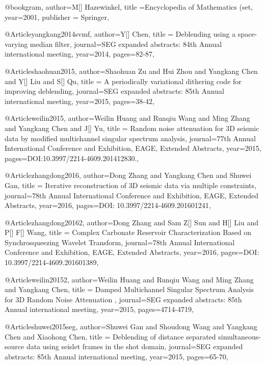 {@book{gram,
  author={M[] Hazewinkel},
  title ={Encyclopedia of Mathematics (set},
  year=2001,
  publisher = {Springer},
}



@Article{yangkang2014svmf,
  author={Y[] Chen},
  title = {Deblending using a space-varying median filter},
  journal={SEG expanded abstracts: 84th Annual international meeting},
  year=2014,
  pages={82-87},
}

@Article{shaohuan2015,
  author={Shaohuan Zu and Hui Zhou and Yangkang Chen and Y[] Liu and S[] Qu},
  title = {A periodically variational dithering code for improving deblending},
  journal={SEG expanded abstracts: 85th Annual international meeting},
  year=2015,
  pages={38-42},
}

@Article{weilin2015,
  author={Weilin Huang and Runqiu Wang and Ming Zhang and Yangkang Chen and J[] Yu},
  title = {Random noise attenuation for 3{D} seismic data by modified multichannel singular spectrum analysis},
  journal={77th Annual International Conference and Exhibition, EAGE, Extended Abstracts},
  year=2015,
  pages={DOI:10.3997/2214-4609.201412830.},
}

@Article{zhangdong2016,
  author={Dong Zhang and Yangkang Chen and Shuwei Gan},
  title = {Iterative reconstruction of 3D seismic data via multiple constraints},
  journal={78th Annual International Conference and Exhibition, EAGE, Extended Abstracts},
  year=2016,
  pages={DOI: 10.3997/2214-4609.201601241},
}

@Article{zhangdong20162,
  author={Dong Zhang and Sam Z[] Sun and H[] Liu and P[] F[] Wang},
  title = {Complex Carbonate Reservoir Characterization Based on Synchrosqueezing Wavelet Transform},
  journal={78th Annual International Conference and Exhibition, EAGE, Extended Abstracts},
  year=2016,
  pages={DOI: 10.3997/2214-4609.201601389},
}

@Article{weilin20152,
  author={Weilin Huang and Runqiu Wang and Ming Zhang and Yangkang Chen},
  title = {Damped Multichannel Singular Spectrum Analysis for 3{D} Random Noise Attenuation },
  journal={SEG expanded abstracts: 85th Annual international meeting},
  year=2015,
  pages={4714-4719},
}



@Article{shuwei2015seg,
  author={Shuwei Gan and Shoudong Wang and Yangkang Chen and Xiaohong Chen},
  title = {Deblending of distance separated simultaneous-source data using seislet frames in the shot domain},
  journal={SEG expanded abstracts: 85th Annual international meeting},
  year=2015,
  pages={65-70},
}

}
